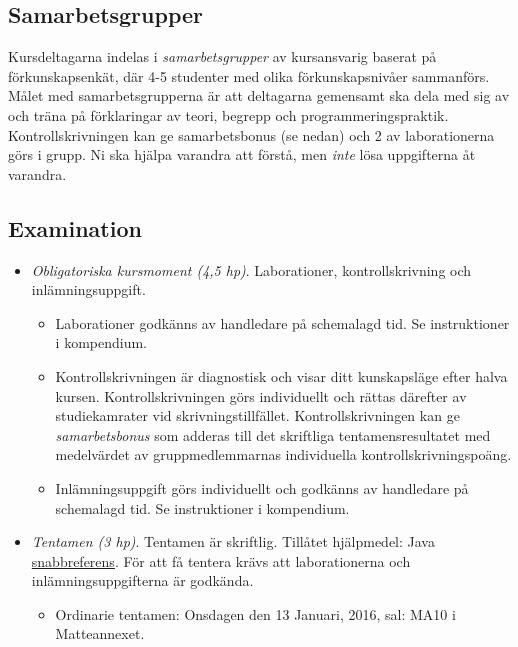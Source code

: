 \subsection{Samarbetsgrupper}\label{samarbetsgrupper}

Kursdeltagarna indelas i \emph{samarbetsgrupper} av kursansvarig baserat
på förkunskapsenkät, där 4-5 studenter med olika förkunskapsnivåer
sammanförs. Målet med samarbetsgrupperna är att deltagarna gemensamt ska
dela med sig av och träna på förklaringar av teori, begrepp och
programmeringspraktik. Kontrollskrivningen kan ge samarbetsbonus (se
nedan) och 2 av laborationerna görs i grupp. Ni ska hjälpa varandra att
förstå, men \emph{inte} lösa uppgifterna åt varandra.

\subsection{Examination}\label{examination}

\begin{itemize}
\item
  \emph{Obligatoriska kursmoment (4,5 hp)}. Laborationer,
  kontrollskrivning och inlämningsuppgift.

  \begin{itemize}
  \item
    Laborationer godkänns av handledare på schemalagd tid. Se
    instruktioner i kompendium.
  \item
    Kontrollskrivningen är diagnostisk och visar ditt kunskapsläge efter
    halva kursen. Kontrollskrivningen görs individuellt och rättas
    därefter av studiekamrater vid skrivningstillfället.
    Kontrollskrivningen kan ge \emph{samarbetsbonus} som adderas till
    det skriftliga tentamensresultatet med medelvärdet av
    gruppmedlemmarnas individuella kontrollskrivningspoäng.
  \item
    Inlämningsuppgift görs individuellt och godkänns av handledare på
    schemalagd tid. Se instruktioner i kompendium.
  \end{itemize}
\item
  \emph{Tentamen (3 hp)}. Tentamen är skriftlig. Tillåtet hjälpmedel:
  Java \href{http://cs.lth.se/eda016/javaref}{snabbreferens}. För att få
  tentera krävs att laborationerna och inlämningsuppgifterna är
  godkända.

  \begin{itemize}
  \itemsep1pt\parskip0pt
  \item
    Ordinarie tentamen: Onsdagen den 13 Januari, 2016, sal: MA10 i
    Matteannexet.
  \end{itemize}
\end{itemize}
